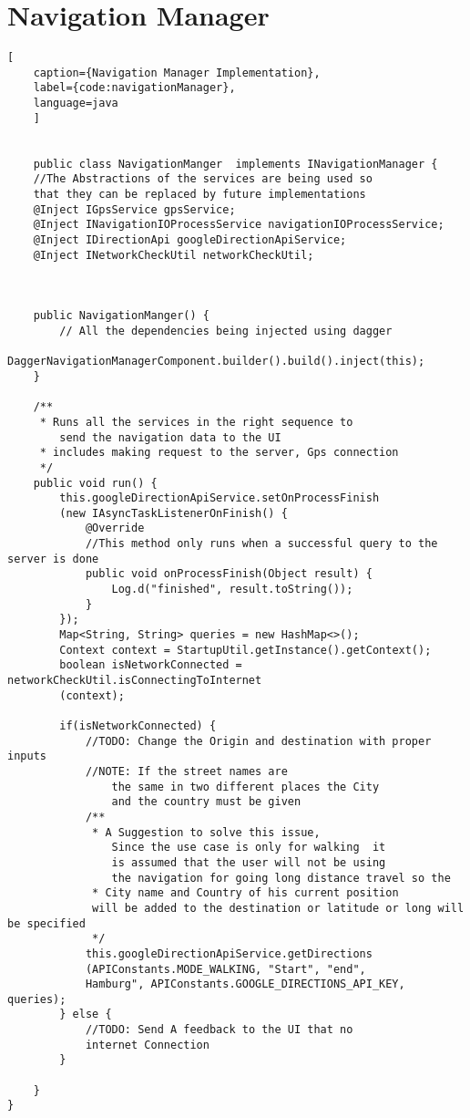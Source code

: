 \newpage
\section{Navigation Manager}
\begin{lstlisting}[
    caption={Navigation Manager Implementation},
    label={code:navigationManager},
    language=java
    ]


    public class NavigationManger  implements INavigationManager {
    //The Abstractions of the services are being used so 
    that they can be replaced by future implementations
    @Inject IGpsService gpsService;
    @Inject INavigationIOProcessService navigationIOProcessService;
    @Inject IDirectionApi googleDirectionApiService;
    @Inject INetworkCheckUtil networkCheckUtil;



    public NavigationManger() {
        // All the dependencies being injected using dagger
        DaggerNavigationManagerComponent.builder().build().inject(this);
    }

    /**
     * Runs all the services in the right sequence to 
        send the navigation data to the UI
     * includes making request to the server, Gps connection
     */
    public void run() {
        this.googleDirectionApiService.setOnProcessFinish
        (new IAsyncTaskListenerOnFinish() {
            @Override
            //This method only runs when a successful query to the server is done
            public void onProcessFinish(Object result) {
                Log.d("finished", result.toString());
            }
        });
        Map<String, String> queries = new HashMap<>();
        Context context = StartupUtil.getInstance().getContext();
        boolean isNetworkConnected = networkCheckUtil.isConnectingToInternet
        (context);

        if(isNetworkConnected) {
            //TODO: Change the Origin and destination with proper inputs
            //NOTE: If the street names are 
                the same in two different places the City 
                and the country must be given
            /**
             * A Suggestion to solve this issue, 
                Since the use case is only for walking  it 
                is assumed that the user will not be using 
                the navigation for going long distance travel so the
             * City name and Country of his current position 
             will be added to the destination or latitude or long will be specified
             */
            this.googleDirectionApiService.getDirections
            (APIConstants.MODE_WALKING, "Start", "end", 
            Hamburg", APIConstants.GOOGLE_DIRECTIONS_API_KEY, queries);
        } else {
            //TODO: Send A feedback to the UI that no 
            internet Connection
        }

    }
}
\end{lstlisting}    


